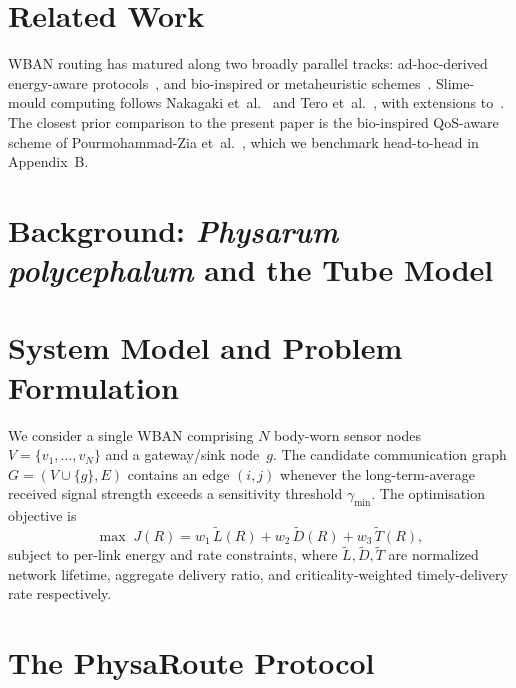 \documentclass[journal,twoside,web]{IEEEtran}
\begin{document}
\section{Related Work}
WBAN routing has matured along two broadly parallel tracks:
ad-hoc-derived energy-aware protocols~\cite{aodv1999,leach2000,mattempt2014,simple2014,colaeeba2015,dareiot2021},
and bio-inspired or metaheuristic
schemes~\cite{dorigo1997,kennedy1995,singh2016,singh2017leach,gwo2014,woa2016,abc2009,mostafaei2019}.
Slime-mould computing follows Nakagaki et~al.~\cite{nakagaki2000} and
Tero et~al.~\cite{tero2010}, with extensions
to~\cite{liu2015physarum,zhang2014fuzzy,gao2019review,gao2016ueta}.
The closest prior comparison to the present paper is the bio-inspired
QoS-aware scheme of Pourmohammad-Zia et~al.~\cite{pz2021}, which we
benchmark head-to-head in Appendix~B.

\section{Background: \textit{Physarum polycephalum} and the Tube Model}

\section{System Model and Problem Formulation}
We consider a single WBAN comprising $N$ body-worn sensor nodes
$V = \{v_1,\ldots,v_N\}$ and a gateway/sink node~$g$.  The candidate
communication graph $G = (V\cup\{g\},E)$ contains an edge $(i,j)$
whenever the long-term-average received signal strength exceeds a
sensitivity threshold $\gamma_{\min}$.  The optimisation objective is
\begin{equation}
\max\; J(R) = w_1\,\tilde{L}(R) + w_2\,\tilde{D}(R) + w_3\,\tilde{T}(R),
\label{eq:obj}
\end{equation}
subject to per-link energy and rate constraints, where
$\tilde{L},\tilde{D},\tilde{T}$ are normalized network lifetime,
aggregate delivery ratio, and criticality-weighted timely-delivery rate
respectively.

\section{The PhysaRoute Protocol}
\end{document}
